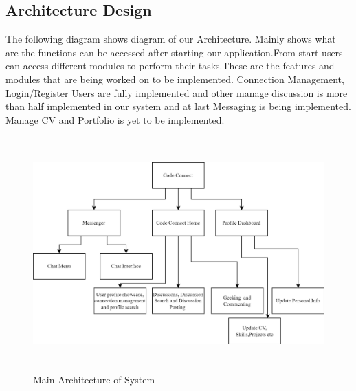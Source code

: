 \subsection{Architecture Design}
The following diagram shows diagram of our Architecture. Mainly shows what are the functions can be accessed after starting our application.From start users can access different modules to perform their tasks.These are the features and modules that are  being worked on to be implemented. Connection Management, Login/Register Users are fully implemented and other manage discussion is more than half implemented in our system and at last Messaging is being implemented. Manage CV and Portfolio is yet to be implemented.
\begin{figure}[H]
    \includegraphics[height = 9cm]{Diagrams/Main_Block.png}
    \caption{Main Architecture of System}
\end{figure}
\newpage
